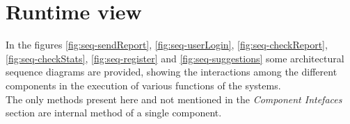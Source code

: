 \documentclass[a4paper]{report}
\begin{document}
\section{Runtime view}
In the figures \ref{fig:seq-sendReport}, \ref{fig:seq-userLogin}, \ref{fig:seq-checkReport}, \ref{fig:seq-checkStats}, \ref{fig:seq-register} and \ref{fig:seq-suggestions} some architectural sequence diagrams are provided, showing the interactions among the different components in the execution of various functions of the systems. \\
The only methods present here and not mentioned in the \textit{Component Intefaces} section are internal method of a single component.
\\\\
\end{document}
